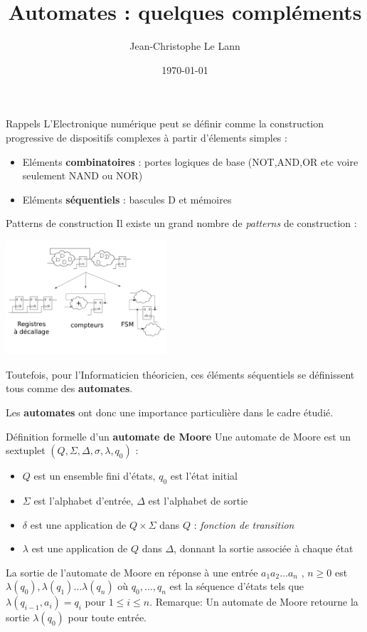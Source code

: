\documentclass[xcolor=table]{beamer}
\title[Automates]{Automates : quelques compléments}
\author{Jean-Christophe Le Lann}
\institute{ENSTA Bretagne}
\date{\today}
\begin{document}
\begin{frame}
\titlepage
\end{frame}

\begin{frame}{Rappels}
  L'Electronique numérique peut se définir comme la construction progressive de dispositifs complexes
  à partir d'élements simples :
  \begin{itemize}
    \item Eléments \textbf{combinatoires} : portes logiques de base (NOT,AND,OR etc voire seulement NAND ou NOR)
    \item Eléments \textbf{séquentiels} : bascules D et mémoires
  \end{itemize}
\end{frame}

\begin{frame}{Patterns de construction}
  Il existe un grand nombre de {\it patterns} de construction :
  \begin{center}
    \includegraphics[width=6cm]{../../POLY/figures/synchrone.png}
  \end{center}

  Toutefois, pour l'Informaticien théoricien, ces éléments séquentiels se définissent tous comme des \textbf{automates}.

  Les \textbf{automates} ont donc une importance particulière dans le cadre étudié.

\end{frame}

\begin{frame}{Définition formelle d'un \textbf{automate de Moore}}
  Une automate de Moore est un sextuplet $(Q, \Sigma, \Delta, \sigma, \lambda, q_0 )$ :
  \begin{itemize}
  \item $Q$ est un ensemble fini d’états, $q_0$ est l’état initial
  \item $\Sigma$ est l’alphabet d’entrée, $\Delta$ est l’alphabet de sortie
  \item $\delta$ est une application de $Q \times \Sigma $ dans $Q$ : {\it fonction de transition}
  \item $\lambda$  est une application de $Q$ dans $\Delta$, donnant la sortie associée à chaque état
  \end{itemize}

  La sortie de l'automate de Moore en réponse à une entrée $a_1 a_2\dots a_n$ , $n \geq 0$ est
  $\lambda(q_0),\lambda(q_1)\dots \lambda(q_n)$ où
  $q_0 ,\dots, q_n$ est la séquence d’états tels que $\lambda(q_{i-1},a_i) = q_i$ pour $1 \leq i \leq n$.
  Remarque: Un automate de Moore retourne la sortie $\lambda(q_0)$ pour toute entrée.
\end{frame}
\end{document}
